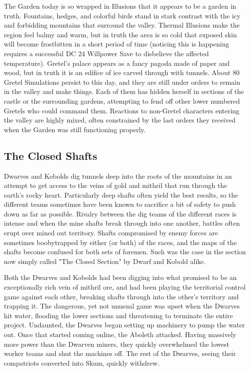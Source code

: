 The Garden today is so wrapped in Illusions that it appears to be a garden in truth. Fountains, hedges, and colorful birds stand in stark contrast with the icy and forbidding mountains that surround the valley. Thermal Illusions make the region feel balmy and warm, but in truth the area is so cold that exposed skin will become frostbitten in a short period of time (noticing this is happening requires a successful DC 24 Willpower Save to disbelieve the affected temperature). Gretel's palace appears as a fancy pagoda made of paper and wood, but in truth it is an edifice of ice carved through with tunnels. About 80 Gretel Simulations persist to this day, and they are still under orders to remain in the valley and make things. Each of them has hidden herself in sections of the castle or the surrounding gardens, attempting to fend off other lower numbered Gretels who could command them. Reactions to non-Gretel characters entering the valley are highly mixed, often constrained by the last orders they received when the Garden was still functioning properly.

\subsection{The Closed Shafts}

Dwarves and Kobolds dig tunnels deep into the roots of the mountains in an attempt to get access to the veins of gold and mithril that run through the earth's rocky heart. Particularly deep shafts often yield the best results, so the different teams sometimes have been known to sacrifice a bit of safety to push down as far as possible. Rivalry between the dig teams of the different races is intense and when the mine shafts break through into one another, battles often erupt over mined out territory. Shafts compromised by enemy forces are sometimes boobytrapped by either (or both) of the races, and the maps of the shafts become confused for both sets of foremen. Such was the case in the section now simply called "The Closed Section" by Dwarf and Kobold alike.

Both the Dwarves and Kobolds had been digging into what promised to be an exceptionally rich vein of mithril ore, and had been playing the territorial control game against each other, breaking shafts through into the other's territory and trapping it. The dangerous, yet not unusual game was upset when the Dwarves hit water, flooding the lower sections and threatening to terminate the entire project. Undaunted, the Dwarves began setting up machinery to pump the water out. Once that started coming online, the Aboleth attacked. Having massively more power than the Dwarven miners, they quickly overwhelmed the lowest worker teams and shut the machines off. The rest of the Dwarves, seeing their compatriots converted into Skum, quickly withdrew.

